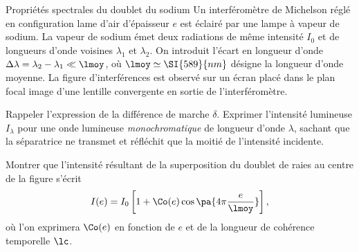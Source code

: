 \begin{exo}[PC][1][TD]{Propriétés spectrales du doublet du sodium}
  Un interféromètre de Michelson réglé en configuration lame d'air d'épaisseur $e$ est éclairé par une lampe à vapeur de sodium. La vapeur de sodium émet deux radiations de même intensité $I_0$ et de longueurs d'onde voisines $\lambda_1$ et $\lambda_2$. On introduit l'écart en longueur d'onde $\Delta\lambda=\lambda_2-\lambda_1 \ll \lmoy $, où $\lmoy \simeq \SI{589}{nm}$ désigne la longueur d'onde moyenne. La figure d'interférences est observé sur un écran placé dans le plan focal image d'une lentille convergente en sortie de l'interféromètre.
  \begin{quest}
  \item Rappeler l'expression de la différence de marche $\delta$. Exprimer l'intensité lumineuse $I_\lambda$ pour une onde lumineuse \emph{monochromatique} de longueur d'onde $\lambda$, sachant que la séparatrice ne transmet et réfléchit que la moitié de l'intensité incidente.
  \item Montrer que l'intensité résultant de la superposition du doublet de raies au centre de la figure s'écrit
  \begin{equation}
    I(e) = I_0\left[1 + \Co(e)\cos\pa{4\pi \frac{e}{\lmoy}}\right],
    \end{equation}
    où l'on exprimera $\Co(e)$ en fonction de $e$ et de la longueur de cohérence temporelle $\lc$.
\end{quest}
\end{exo}
